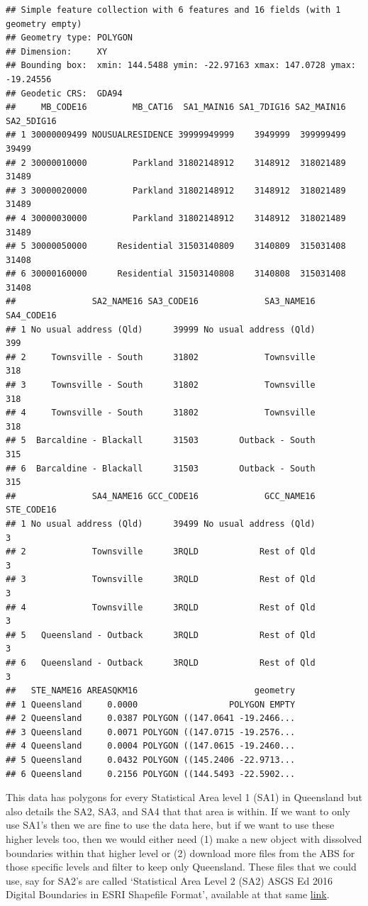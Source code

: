 \documentclass[
]{book}
\begin{document}
\begin{verbatim}
## Simple feature collection with 6 features and 16 fields (with 1 geometry empty)
## Geometry type: POLYGON
## Dimension:     XY
## Bounding box:  xmin: 144.5488 ymin: -22.97163 xmax: 147.0728 ymax: -19.24556
## Geodetic CRS:  GDA94
##     MB_CODE16         MB_CAT16  SA1_MAIN16 SA1_7DIG16 SA2_MAIN16 SA2_5DIG16
## 1 30000009499 NOUSUALRESIDENCE 39999949999    3949999  399999499      39499
## 2 30000010000         Parkland 31802148912    3148912  318021489      31489
## 3 30000020000         Parkland 31802148912    3148912  318021489      31489
## 4 30000030000         Parkland 31802148912    3148912  318021489      31489
## 5 30000050000      Residential 31503140809    3140809  315031408      31408
## 6 30000160000      Residential 31503140808    3140808  315031408      31408
##               SA2_NAME16 SA3_CODE16             SA3_NAME16 SA4_CODE16
## 1 No usual address (Qld)      39999 No usual address (Qld)        399
## 2     Townsville - South      31802             Townsville        318
## 3     Townsville - South      31802             Townsville        318
## 4     Townsville - South      31802             Townsville        318
## 5  Barcaldine - Blackall      31503        Outback - South        315
## 6  Barcaldine - Blackall      31503        Outback - South        315
##               SA4_NAME16 GCC_CODE16             GCC_NAME16 STE_CODE16
## 1 No usual address (Qld)      39499 No usual address (Qld)          3
## 2             Townsville      3RQLD            Rest of Qld          3
## 3             Townsville      3RQLD            Rest of Qld          3
## 4             Townsville      3RQLD            Rest of Qld          3
## 5   Queensland - Outback      3RQLD            Rest of Qld          3
## 6   Queensland - Outback      3RQLD            Rest of Qld          3
##   STE_NAME16 AREASQKM16                       geometry
## 1 Queensland     0.0000                  POLYGON EMPTY
## 2 Queensland     0.0387 POLYGON ((147.0641 -19.2466...
## 3 Queensland     0.0071 POLYGON ((147.0715 -19.2576...
## 4 Queensland     0.0004 POLYGON ((147.0615 -19.2460...
## 5 Queensland     0.0432 POLYGON ((145.2406 -22.9713...
## 6 Queensland     0.2156 POLYGON ((144.5493 -22.5902...
\end{verbatim}

This data has polygons for every Statistical Area level 1 (SA1) in Queensland but also details the SA2, SA3, and SA4 that that area is within. If we want to only use SA1's then we are fine to use the data here, but if we want to use these higher levels too, then we would either need (1) make a new object with dissolved boundaries within that higher level or (2) download more files from the ABS for those specific levels and filter to keep only Queensland. These files that we could use, say for SA2's are called `Statistical Area Level 2 (SA2) ASGS Ed 2016 Digital Boundaries in ESRI Shapefile Format', available at that same \href{https://www.abs.gov.au/AUSSTATS/abs@.nsf/DetailsPage/1270.0.55.001July\%202016?OpenDocument}{link}.
\end{document}
